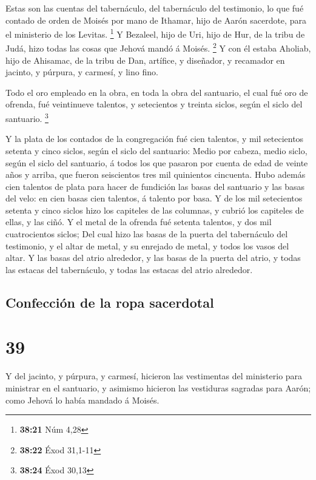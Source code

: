  Estas son las cuentas del tabernáculo, del tabernáculo del
testimonio, lo que fué contado de orden de Moisés por mano de Ithamar,
hijo de Aarón sacerdote, para el ministerio de los Levitas. \footnote{\textbf{38:21}
  Núm 4,28}  Y Bezaleel, hijo de Uri, hijo de Hur, de la
tribu de Judá, hizo todas las cosas que Jehová mandó á Moisés.
\footnote{\textbf{38:22} Éxod 31,1-11}  Y con él estaba
Aholiab, hijo de Ahisamac, de la tribu de Dan, artífice, y diseñador, y
recamador en jacinto, y púrpura, y carmesí, y lino fino.

 Todo el oro empleado en la obra, en toda la obra del
santuario, el cual fué oro de ofrenda, fué veintinueve talentos, y
setecientos y treinta siclos, según el siclo del santuario. \footnote{\textbf{38:24}
  Éxod 30,13}

 Y la plata de los contados de la congregación fué cien
talentos, y mil setecientos setenta y cinco siclos, según el siclo del
santuario:  Medio por cabeza, medio siclo, según el siclo
del santuario, á todos los que pasaron por cuenta de edad de veinte años
y arriba, que fueron seiscientos tres mil quinientos cincuenta.
 Hubo además cien talentos de plata para hacer de fundición
las basas del santuario y las basas del velo: en cien basas cien
talentos, á talento por basa.  Y de los mil setecientos
setenta y cinco siclos hizo los capiteles de las columnas, y cubrió los
capiteles de ellas, y las ciñó.  Y el metal de la ofrenda
fué setenta talentos, y dos mil cuatrocientos siclos;  Del
cual hizo las basas de la puerta del tabernáculo del testimonio, y el
altar de metal, y su enrejado de metal, y todos los vasos del altar.
 Y las basas del atrio alrededor, y las basas de la puerta
del atrio, y todas las estacas del tabernáculo, y todas las estacas del
atrio alrededor.

\hypertarget{confecciuxf3n-de-la-ropa-sacerdotal}{%
\subsection{Confección de la ropa
sacerdotal}\label{confecciuxf3n-de-la-ropa-sacerdotal}}

\hypertarget{section-38}{%
\section{39}\label{section-38}}

 Y del jacinto, y púrpura, y carmesí, hicieron las
vestimentas del ministerio para ministrar en el santuario, y asimismo
hicieron las vestiduras sagradas para Aarón; como Jehová lo había
mandado á Moisés.

